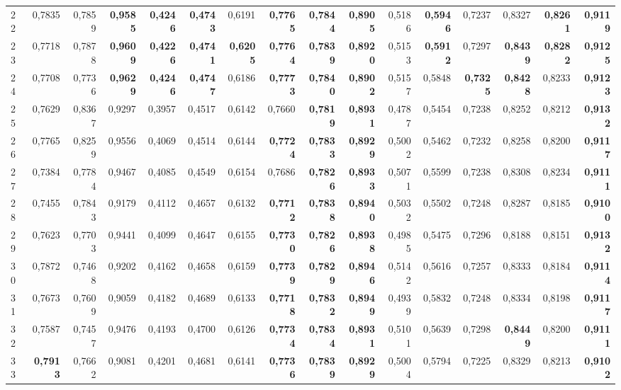 \begin{table}[htp!]
\begin{adjustwidth}{-2cm}{}
\begin{tabular}{ l | *{15}{| r}}
22	&	0,7835	&	0,7859	&	\textbf{0,9585}	&	\textbf{0,4246}	&	\textbf{0,4743}	&	0,6191	&	\textbf{0,7765}	&	\textbf{0,7844}	&	\textbf{0,8905}	&	0,5186	&	\textbf{0,5946}	&	0,7237	&	0,8327	&	\textbf{0,8261}	&	\textbf{0,9119}	\\
23	&	0,7718	&	0,7878	&	\textbf{0,9609}	&	\textbf{0,4226}	&	\textbf{0,4741}	&	\textbf{0,6205}	&	\textbf{0,7764}	&	\textbf{0,7839}	&	\textbf{0,8920}	&	0,5153	&	\textbf{0,5912}	&	0,7297	&	\textbf{0,8439}	&	\textbf{0,8282}	&	\textbf{0,9125}	\\
24	&	0,7708	&	0,7736	&	\textbf{0,9629}	&	\textbf{0,4246}	&	\textbf{0,4747}	&	0,6186	&	\textbf{0,7773}	&	\textbf{0,7840}	&	\textbf{0,8902}	&	0,5157	&	0,5848	&	\textbf{0,7325}	&	\textbf{0,8428}	&	0,8233	&	\textbf{0,9123}	\\
25	&	0,7629	&	0,8367	&	0,9297	&	0,3957	&	0,4517	&	0,6142	&	0,7660	&	\textbf{0,7819}	&	\textbf{0,8931}	&	0,4787	&	0,5454	&	0,7238	&	0,8252	&	0,8212	&	\textbf{0,9132}	\\
26	&	0,7765	&	0,8259	&	0,9556	&	0,4069	&	0,4514	&	0,6144	&	\textbf{0,7724}	&	\textbf{0,7833}	&	\textbf{0,8929}	&	0,5002	&	0,5462	&	0,7232	&	0,8258	&	0,8200	&	\textbf{0,9117}	\\
27	&	0,7384	&	0,7784	&	0,9467	&	0,4085	&	0,4549	&	0,6154	&	0,7686	&	\textbf{0,7826}	&	\textbf{0,8933}	&	0,5071	&	0,5599	&	0,7238	&	0,8308	&	0,8234	&	\textbf{0,9111}	\\
28	&	0,7455	&	0,7843	&	0,9179	&	0,4112	&	0,4657	&	0,6132	&	\textbf{0,7712}	&	\textbf{0,7838}	&	\textbf{0,8940}	&	0,5032	&	0,5502	&	0,7248	&	0,8287	&	0,8185	&	\textbf{0,9100}	\\
29	&	0,7623	&	0,7703	&	0,9441	&	0,4099	&	0,4647	&	0,6155	&	\textbf{0,7730}	&	\textbf{0,7826}	&	\textbf{0,8938}	&	0,4985	&	0,5475	&	0,7296	&	0,8188	&	0,8151	&	\textbf{0,9132}	\\
30	&	0,7872	&	0,7468	&	0,9202	&	0,4162	&	0,4658	&	0,6159	&	\textbf{0,7739}	&	\textbf{0,7829}	&	\textbf{0,8946}	&	0,5142	&	0,5616	&	0,7257	&	0,8333	&	0,8184	&	\textbf{0,9114}	\\
31	&	0,7673	&	0,7609	&	0,9059	&	0,4182	&	0,4689	&	0,6133	&	\textbf{0,7718}	&	\textbf{0,7832}	&	\textbf{0,8949}	&	0,4939	&	0,5832	&	0,7248	&	0,8334	&	0,8198	&	\textbf{0,9117}	\\
32	&	0,7587	&	0,7457	&	0,9476	&	0,4193	&	0,4700	&	0,6126	&	\textbf{0,7734}	&	\textbf{0,7834}	&	\textbf{0,8931}	&	0,5101	&	0,5639	&	0,7298	&	\textbf{0,8449}	&	0,8200	&	\textbf{0,9111}	\\
33	&	\textbf{0,7913}	&	0,7662	&	0,9081	&	0,4201	&	0,4681	&	0,6141	&	\textbf{0,7736}	&	\textbf{0,7839}	&	\textbf{0,8929}	&	0,5004	&	0,5794	&	0,7225	&	0,8329	&	0,8213	&	\textbf{0,9102}	\\

\end{tabular}
\end{adjustwidth}
\end{table}
